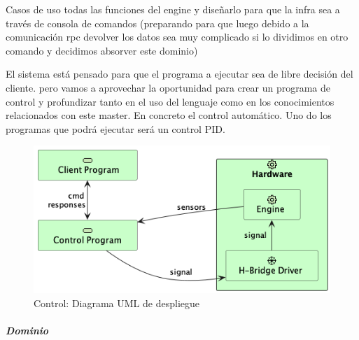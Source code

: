 Casos de uso todas las funciones del engine y diseñarlo para que la infra sea a través de consola de comandos (preparando para que luego debido a la comunicación rpc devolver los datos sea muy complicado si lo dividimos en otro comando y decidimos absorver este dominio)

El sistema está pensado para que el programa a ejecutar sea de libre decisión del cliente. pero vamos a aprovechar la oportunidad para crear un programa de control y profundizar tanto en el uso del lenguaje como en los conocimientos relacionados con este master. En concreto el control automático. Uno do los programas que podrá ejecutar será un control PID.



\begin{figure}[H]
    \centering
    \includegraphics[height=0.2\textheight]{./part/Proyecto_ejecutivo/memoria_descriptiva/descripcionDelProyecto/control/uml/controlConcept}
    \caption{Control: Diagrama UML de despliegue}\label{fig:Control-Diagrama UML de despliegue}
\end{figure}

\subparagraph{Dominio}

